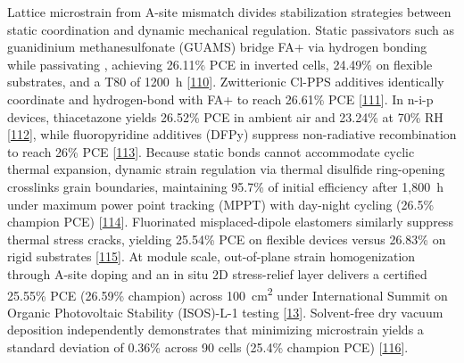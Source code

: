 \documentclass[
  11pt,
]{article}
\begin{document}
Lattice microstrain from A-site mismatch divides stabilization
strategies between static coordination and dynamic mechanical
regulation. Static passivators such as guanidinium methanesulfonate
(GUAMS) bridge FA+ via hydrogen bonding while passivating ,
achieving 26.11\% PCE in inverted cells, 24.49\% on flexible substrates,
and a T80 of \qty{1200}{\hour}
{[}\href{https://doi.org/10.1002/adfm.76197}{110}{]}. Zwitterionic
Cl-PPS additives identically coordinate  and hydrogen-bond
with FA+ to reach 26.61\% PCE
{[}\href{https://doi.org/10.1002/aenm.71105}{111}{]}. In n-i-p devices,
thiacetazone yields 26.52\% PCE in ambient air and 23.24\% at 70\% RH
{[}\href{https://doi.org/10.1002/adma.202523630}{112}{]}, while
fluoropyridine additives (DFPy) suppress non-radiative recombination to
reach 26\% PCE {[}\href{https://doi.org/10.1002/adfm.202526679}{113}{]}.
Because static bonds cannot accommodate cyclic thermal expansion,
dynamic strain regulation via thermal disulfide ring-opening crosslinks
grain boundaries, maintaining 95.7\% of initial efficiency after
1,\qty{800}{\hour} under maximum power point tracking (MPPT) with
day-night cycling (26.5\% champion PCE)
{[}\href{https://doi.org/10.1038/s41467-026-70697-5}{114}{]}.
Fluorinated misplaced-dipole elastomers similarly suppress thermal
stress cracks, yielding 25.54\% PCE on flexible devices versus 26.83\%
on rigid substrates
{[}\href{https://doi.org/10.1038/s41467-026-74285-5}{115}{]}. At module
scale, out-of-plane strain homogenization through A-site doping and an
in situ 2D stress-relief layer delivers a certified 25.55\% PCE (26.59\%
champion) across \qty{100}{\centi\meter\squared} under International
Summit on Organic Photovoltaic Stability (ISOS)-L-1 testing
{[}\href{https://doi.org/10.1126/sciadv.aec3238}{13}{]}. Solvent-free
dry vacuum deposition independently demonstrates that minimizing
microstrain yields a standard deviation of 0.36\% across 90 cells
(25.4\% champion PCE)
{[}\href{https://doi.org/10.1002/cey2.70236}{116}{]}.
\end{document}
